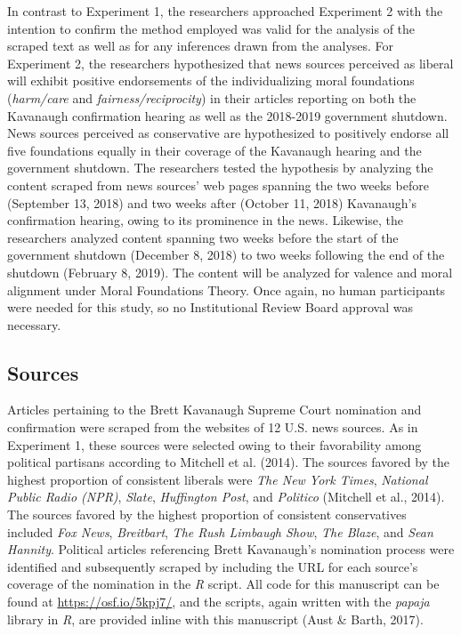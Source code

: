 \documentclass[english,,man]{apa6}
\begin{document}
In contrast to Experiment 1, the researchers approached Experiment 2 with the intention to confirm the method employed was valid for the analysis of the scraped text as well as for any inferences drawn from the analyses. For Experiment 2, the researchers hypothesized that news sources perceived as liberal will exhibit positive endorsements of the individualizing moral foundations (\emph{harm/care} and \emph{fairness/reciprocity}) in their articles reporting on both the Kavanaugh confirmation hearing as well as the 2018-2019 government shutdown. News sources perceived as conservative are hypothesized to positively endorse all five foundations equally in their coverage of the Kavanaugh hearing and the government shutdown. The researchers tested the hypothesis by analyzing the content scraped from news sources' web pages spanning the two weeks before (September 13, 2018) and two weeks after (October 11, 2018) Kavanaugh's confirmation hearing, owing to its prominence in the news. Likewise, the researchers analyzed content spanning two weeks before the start of the government shutdown (December 8, 2018) to two weeks following the end of the shutdown (February 8, 2019). The content will be analyzed for valence and moral alignment under Moral Foundations Theory. Once again, no human participants were needed for this study, so no Institutional Review Board approval was necessary.

\hypertarget{sources-1}{%
\subsection{Sources}\label{sources-1}}

Articles pertaining to the Brett Kavanaugh Supreme Court nomination and confirmation were scraped from the websites of 12 U.S. news sources. As in Experiment 1, these sources were selected owing to their favorability among political partisans according to Mitchell et al. (2014). The sources favored by the highest proportion of consistent liberals were \emph{The New York Times}, \emph{National Public Radio (NPR)}, \emph{Slate}, \emph{Huffington Post}, and \emph{Politico} (Mitchell et al., 2014). The sources favored by the highest proportion of consistent conservatives included \emph{Fox News}, \emph{Breitbart}, \emph{The Rush Limbaugh Show}, \emph{The Blaze}, and \emph{Sean Hannity}. Political articles referencing Brett Kavanaugh's nomination process were identified and subsequently scraped by including the URL for each source's coverage of the nomination in the \emph{R} script. All code for this manuscript can be found at \url{https://osf.io/5kpj7/}, and the scripts, again written with the \emph{papaja} library in \emph{R}, are provided inline with this manuscript (Aust \& Barth, 2017).
\end{document}
